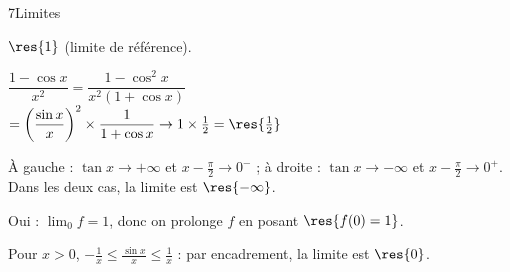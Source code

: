 \begin{deuxcolonnes}
\begin{corrige}{7}{Limites}
\begin{questions}
  \item $\res{1}$ (limite de référence).
  \item $\dfrac{1-\cos x}{x^{2}}=\dfrac{1-\cos^{2}x}{x^{2}(1+\cos x)}$\\[1mm]
    $=\left(\dfrac{\sin x}{x}\right)^{2}\times\dfrac{1}{1+\cos x}\to1\times\frac12=\res{\frac12}$
  \item À gauche : $\tan x\to+\infty$ et $x-\frac{\pi}{2}\to0^{-}$ ; à droite : $\tan x\to-\infty$ et $x-\frac{\pi}{2}\to0^{+}$.
    Dans les deux cas, la limite est $\res{-\infty}$.
  \item Oui : $\lim_{0}f=1$, donc on prolonge $f$ en posant $\res{f(0)=1}$.
  \item Pour $x>0$, $-\frac1x\leq\frac{\sin x}{x}\leq\frac1x$ : par encadrement, la limite est $\res{0}$.
\end{questions}
\end{corrige}

\end{deuxcolonnes}

